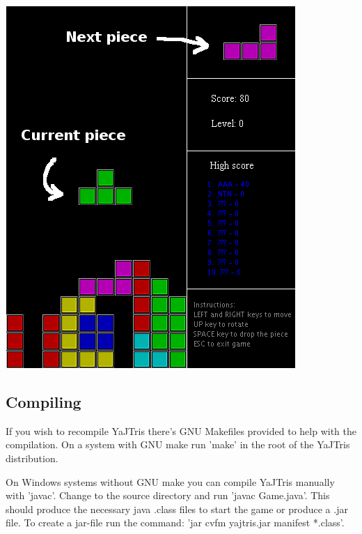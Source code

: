 \begin{center}
  \includegraphics[scale=0.5]{screenshot.png}
\end{center}

\subsection {Compiling}

If you wish to recompile YaJTris there's GNU Makefiles provided to help with the compilation.
On a system with GNU make run 'make' in the root of the YaJTris distribution.

On Windows systems without GNU make you can compile YaJTris manually with 'javac'. Change to the
source directory and run 'javac Game.java'. This should produce the necessary java .class files to
start the game or produce a .jar file. To create a jar-file run the command:
'jar cvfm yajtris.jar manifest *.class'.
